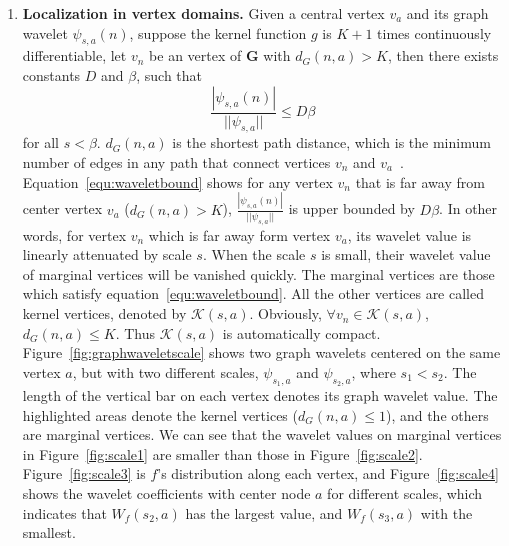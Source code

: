 \documentclass[twoside,leqno,twocolumn]{article}
\begin{document}
\begin{enumerate}
\item \textbf{Localization in vertex domains.} Given a central vertex $v_a$ and its graph wavelet $\psi_{s,a}(n)$, suppose the kernel function $g$ is $K+1$ times continuously differentiable, let $v_n$ be an vertex of $\mathbf{G}$ with $d_G(n,a)>K$, then there exists constants $D$ and $\beta$, such that
\begin{equation}
\label{equ:waveletbound}
\frac{|\psi_{s,a}(n)|}{||\psi_{s,a}||}\leq D \beta
\end{equation} for all $s<\beta$.
$d_G(n,a)$ is the shortest path distance, which is the minimum number of edges in any path that connect vertices $v_n$ and $v_a$~\cite{hammond2011wavelets}. Equation~\ref{equ:waveletbound} shows for any vertex $v_n$ that is far away from center vertex $v_a$ ($d_G(n,a)>K$), $\frac{|\psi_{s,a}(n)|}{||\psi_{s,a}||}$ is upper bounded by $D\beta$. In other words, for vertex $v_n$ which is far away form vertex $v_a$, its wavelet value is linearly attenuated by scale $s$.  When the scale $s$ is small, their wavelet value of marginal vertices will be vanished quickly. The marginal vertices are those which satisfy equation~\ref{equ:waveletbound}. All the other vertices are called kernel vertices, denoted by $\mathcal{K}(s,a)$. Obviously, $\forall v_n \in \mathcal{K}(s,a)$,  $d_G(n,a)\le K$. Thus $\mathcal{K}(s,a)$ is automatically compact.
Figure~\ref{fig:graphwaveletscale} shows two graph wavelets centered on the same vertex $a$, but with two different scales, $\psi_{s_1,a}$ and $\psi_{s_2, a}$, where $s_1<s_2$. The length of the vertical bar on each vertex denotes its graph wavelet value. The highlighted areas denote the kernel vertices ($d_G(n,a)\le 1$), and the others are marginal vertices. We can see that the wavelet values on marginal vertices in Figure~\ref{fig:scale1} are smaller than those in Figure~\ref{fig:scale2}. Figure~\ref{fig:scale3} is $f$'s distribution along each vertex, and Figure~\ref{fig:scale4} shows the wavelet coefficients with center node $a$ for different scales, which indicates that
$W_f(s_2,a)$ has the largest value, and $W_f(s_3,a)$ with the smallest.
 \end{enumerate}
\end{document}
